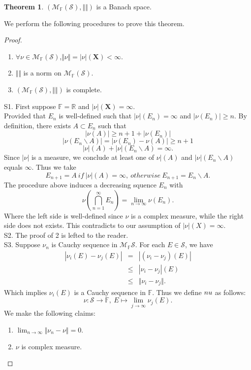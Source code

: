 \documentclass[12pt]{book}
\theoremstyle{definition}
\newtheorem{theorem}{Theorem}[chapter]
\newcommand{\R}{\mathbb{R}}
\newcommand{\F}{\mathbb{F}}
\newcommand{\X}{\mathbf{X}}
\newcommand{\M}{\mathcal{M}}
\newcommand{\Intersection}[2]{{\bigcap_{#1}^{#2}}}
\begin{document}
\begin{theorem}\label{Banach_Measure} 
$(\M_\F(\mathcal S),\Vert\Vert)$ is a Banach space.	
\end{theorem}
We perform the following procedures to prove this theorem.

\begin{proof} \
\begin{enumerate}
	\item $\forall \nu \in \M_\F(\mathcal S)$,$\Vert \nu \Vert=|\nu|(\X) <  \infty$.
	\item $\Vert \Vert$ is a norm on $\M_\F(\mathcal S)$.
	\item $(\M_{\F}(\mathcal S),\Vert \Vert)$ is complete. 
\end{enumerate}
S1. First suppose $\F=\R$ and $| \nu|(\X)=\infty$. \\
Provided that $E_n$ is well-defined such that $|\nu|(E_n)=\infty$ and $|\nu(E_n)|\geq n$.
By definition, there exists $A \subset E_n$ such that
$$
|\nu(A)| \geq n+1 + |\nu(E_n)|
$$
$$
|\nu(E_n \backslash A)| = |\nu(E_n)-\nu(A)| \geq n+1
$$
$$
|\nu|(A) + |\nu|(E_n\backslash A) = \infty.
$$
Since $|\nu|$ is a measure, we conclude at least one of $\nu|(A)$ and $|\nu|(E_n\backslash A)$ equals $\infty$. Thus we take
$$
E_{n+1} = A  \ if \  |\nu|(A)=\infty, \ otherwise \ E_{n+1} = E_n \backslash A.
$$
The procedure above induces a decreasing squence $E_n$ with
$$
\nu(\Intersection{n=1}{\infty}E_n) = \lim_{n \to \infty}\nu(E_n).
$$
Where the left side is well-defined since $\nu$ is a complex measure, while the right side does not exists. This contradicts to our assumption of $|\nu|(X)=\infty$. \\
S2. The proof of 2 is lefted to the reader. \\
S3. Suppose $\nu_n$ is Cauchy sequence in $\M_\F \mathcal S$. For each $E\in \mathcal S$, we have
\begin{eqnarray*}
	|\nu_i(E)-\nu_j(E)| &=& |(\nu_i-\nu_j)(E)| \\
	&\leq & |\nu_i-\nu_j|(E) \\
	&\leq & \Vert \nu_i - \nu_j \Vert.
\end{eqnarray*}
Which implies $\nu_i(E)$ is a Cauchy sequence in $\F$. Thus we define $\\nu$ as follows:
$$
\nu: \mathcal{S} \to \F, \ E \mapsto \lim_{j \to \infty}\nu_j(E).
$$
We make the following claims:
\begin{enumerate}
	\item $\lim_{n\to \infty} \Vert \nu_n-\nu\Vert =0$.
	\item $\nu$ is complex measure.

\end{enumerate}
\end{proof}
\end{document}
